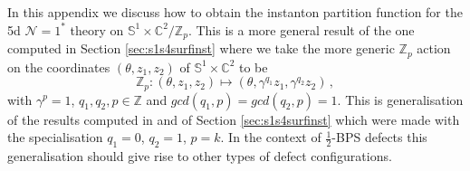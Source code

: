 \documentclass[main.tex]{subfiles}
\begin{document}
 
In this appendix we discuss how to obtain the instanton partition function for the 5d $\mathcal{N}=1^*$ theory on $\mathbb{S}^1\times\mathbb{C}^2/\mathbb{Z}_p$. This is a more general result of the one computed in Section \ref{sec:s1s4surfinst} where we take the more generic $\mathbb{Z}_p$ action on the coordinates $(\theta,z_1,z_2)$ of $\mathbb{S}^1\times\mathbb{C}^2$ to be
\begin{equation}\label{eqn:genorbq1q2}
\mathbb{Z}_p:(\theta,z_1,z_2)\mapsto(\theta,\gamma^{q_1}z_1,\gamma^{q_2}z_2)\,,
\end{equation}
with $\gamma^p=1$, $q_1,q_2,p\in\mathbb{Z}$ and $gcd(q_1,p)=gcd(q_2,p)=1$. This is generalisation of the results computed in \cite{Kanno:2011fw} and of Section \ref{sec:s1s4surfinst} which were made with the specialisation $q_1=0$, $q_2=1$, $p=k$. In the context of $\frac{1}{2}$-BPS defects this generalisation should give rise to other types of defect configurations.
\end{document}
